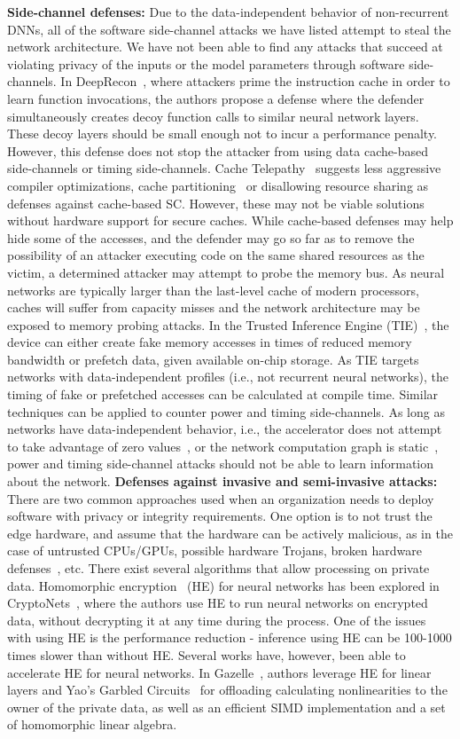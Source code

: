 \noindent \textbf{Side-channel defenses:}
Due to the data-independent behavior of non-recurrent DNNs, all of the software side-channel attacks we have listed attempt to steal the network architecture. We have not been able to find any attacks that succeed at violating privacy of the inputs or the model parameters through software side-channels.
In DeepRecon~, where attackers prime the instruction cache in order to learn function invocations, the authors propose a defense where the defender simultaneously creates decoy function calls to similar neural network layers. These decoy layers should be small enough not to incur a performance penalty. However, this defense does not stop the attacker from using data cache-based side-channels or timing side-channels.
Cache Telepathy~ suggests less aggressive compiler optimizations, cache partitioning~ or disallowing resource sharing as defenses against cache-based SC. However, these may not be viable solutions without hardware support for secure caches.
While cache-based defenses may help hide some of the accesses, and the defender may go so far as to remove the possibility of an attacker executing code on the same shared resources as the victim, a determined attacker may attempt to probe the memory bus. As neural networks are typically larger than the last-level cache of modern processors, caches will suffer from capacity misses and the network architecture may be exposed to memory probing attacks.
In the Trusted Inference Engine (TIE)~, the device can either create fake memory accesses in times of reduced memory bandwidth or prefetch data, given available on-chip storage. As TIE targets networks with data-independent profiles (i.e., not recurrent neural networks), the timing of fake or prefetched accesses can be calculated at compile time.
Similar techniques can be applied to counter power and timing side-channels. As long as networks have data-independent behavior, i.e., the accelerator does not attempt to take advantage of zero values~, or the network computation graph is static~, power and timing side-channel attacks should not be able to learn information about the network. 
\noindent \textbf{Defenses against invasive and semi-invasive attacks:}
There are two common approaches used when an organization needs to deploy software with privacy or integrity requirements. One option is to not trust the edge hardware, and assume that the hardware can be actively malicious, as in the case of untrusted CPUs/GPUs, possible hardware Trojans, broken hardware defenses~, etc. 
There exist several algorithms that allow processing on private data. Homomorphic encryption~ (HE) for neural networks has been explored in CryptoNets~, where the authors use HE to run neural networks on encrypted data, without decrypting it at any time during the process. One of the issues with using HE is the performance reduction - inference using HE can be 100-1000 times slower than without HE. Several works have, however, been able to accelerate HE for neural networks. In Gazelle~, authors leverage HE for linear layers and Yao's Garbled Circuits~ for offloading calculating nonlinearities to the owner of the private data, as well as an efficient SIMD implementation and a set of homomorphic linear algebra.

